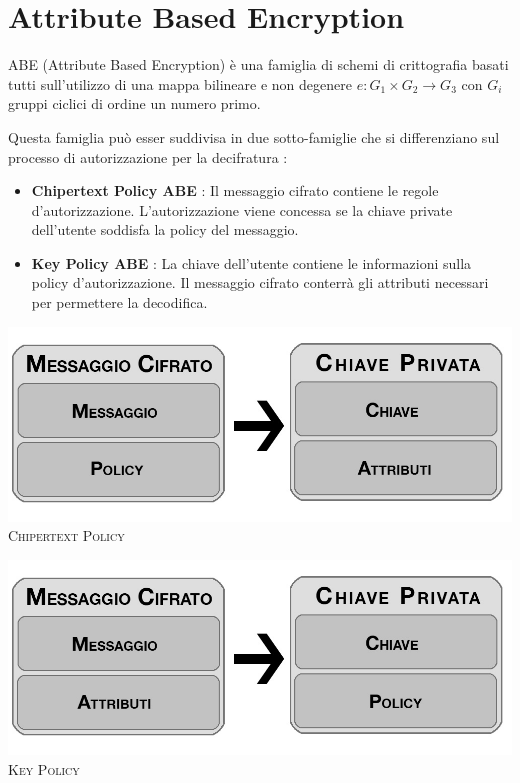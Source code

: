 \chapter{Attribute Based Encryption}

ABE (Attribute Based Encryption) è una famiglia di schemi di crittografia basati tutti sull'utilizzo di una mappa bilineare e non degenere $e:G_1 \times G_2 \rightarrow G_3$ con $G_i$ gruppi ciclici di ordine un numero primo.

Questa famiglia può esser suddivisa in due sotto-famiglie che si differenziano sul processo di autorizzazione per la decifratura :
\begin{itemize}
	\item \textbf{{Chipertext Policy ABE}} :  Il messaggio cifrato contiene le regole d'autorizzazione. L'autorizzazione viene concessa se la chiave private dell'utente soddisfa la policy del messaggio.
	\item \textbf{Key Policy ABE} : La chiave dell'utente contiene le informazioni sulla policy d'autorizzazione. Il messaggio cifrato conterrà gli attributi necessari per permettere la decodifica.
\end{itemize}

\begin{minipage}[c]{0.9\textwidth}
\vspace{0,3cm}
\centering
	\begin{minipage}[c]{0.45\textwidth}
		\centering
		\includegraphics[keepaspectratio,width=\textwidth]{CT.jpg}\\
		{\small\scshape Chipertext Policy}
	\end{minipage}
	\hfill
	\begin{minipage}[c]{0.45\textwidth}
		\centering
		\includegraphics[keepaspectratio,width=\textwidth]{KP.jpg}\\
		{\small\scshape Key Policy}
	\end{minipage}
\vspace{0,8cm}
\end{minipage}

